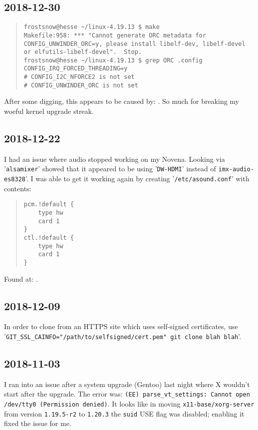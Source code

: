 \documentclass{article}
\begin{document}
\subsection{2018-12-30}
\begin{quote}
\begin{verbatim}
frostsnow@hesse ~/linux-4.19.13 $ make
Makefile:958: *** "Cannot generate ORC metadata for CONFIG_UNWINDER_ORC=y, please install libelf-dev, libelf-devel or elfutils-libelf-devel".  Stop.
frostsnow@hesse ~/linux-4.19.13 $ grep ORC .config
CONFIG_IRQ_FORCED_THREADING=y
# CONFIG_I2C_NFORCE2 is not set
# CONFIG_UNWINDER_ORC is not set
\end{verbatim}
\end{quote}
After some digging, this appears to be caused by: .  So much for breaking my woeful kernel upgrade streak.

\subsection{2018-12-22}
I had an issue where audio stopped working on my Novena.  Looking via '\texttt{alsamixer}' showed that it appeared to be using '\texttt{DW-HDMI}' instead of \texttt{imx-audio-es8328}'.  I was able to get it working again by creating '\texttt{/etc/asound.conf}' with contents:

\begin{quote}
\begin{verbatim}
pcm.!default {
	type hw
	card 1
}
ctl.!default {
	type hw
	card 1
}
\end{verbatim}
\end{quote}
Found at: .

\subsection{2018-12-09}
In order to clone from an HTTPS site which uses self-signed certificates, use '\texttt{GIT_SSL_CAINFO="/path/to/selfsigned/cert.pem" git clone blah blah}'.

\subsection{2018-11-03}
I ran into an issue after a system upgrade (Gentoo) last night where X wouldn't start after the upgrade.  The error was: \texttt{(EE) parse_vt_settings: Cannot open /dev/tty0 (Permission denied)}.  It looks like in moving \texttt{x11-base/xorg-server} from version \texttt{1.19.5-r2} to \texttt{1.20.3}  the \texttt{suid} USE flag was disabled; enabling it fixed the issue for me.
\end{document}
